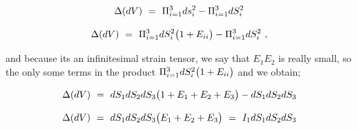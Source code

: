 \documentclass{article}
\begin{document}
\begin{equation} \label{eq:1}
 \Delta ( dV ) \hspace{0.125cm} = \hspace{0.125cm} \Pi_{i \hspace{0.005cm} = \hspace{0.005cm} 1}^{3} ds_{i}^2 - \Pi_{i \hspace{0.005cm} = \hspace{0.005cm} 1}^{3} dS_{i}^2 
\end{equation} 

\begin{equation} \label{eq:1}
 \Delta ( dV ) \hspace{0.125cm} = \hspace{0.125cm} \Pi_{i \hspace{0.005cm} = \hspace{0.005cm} 1}^{3} dS_{i}^2 \big( 1 + E_{i i} \big) - \Pi_{i \hspace{0.005cm} = \hspace{0.005cm} 1}^{3} dS_{i}^2  \hspace{0.125cm} ,
\end{equation} 

and because its an infinitesimal strain tensor, we say that \begin{math} E_1 E_2 \end{math} is really small, so the only some terms in the product \begin{math} \Pi_{i \hspace{0.005cm} = \hspace{0.005cm} 1}^{3} dS_{i}^2 \big( 1 + E_{i i} \big) \end{math} and we obtain;

\begin{equation} \label{eq:1}
 \Delta ( dV ) \hspace{0.125cm} = \hspace{0.125cm}  dS_1 dS_2 dS_3 \big( 1 + E_1 + E_2 + E_3 \big) - dS_1 dS_2 dS_3 
\end{equation} 

\begin{equation} \label{eq:1}
 \Delta ( dV ) \hspace{0.125cm} = \hspace{0.125cm}  dS_1 dS_2 dS_3 \big( E_1 + E_2 + E_3 \big) \hspace{0.125cm} = \hspace{0.125cm}  I_1 dS_1 dS_2 dS_3
\end{equation} 
\end{document}
